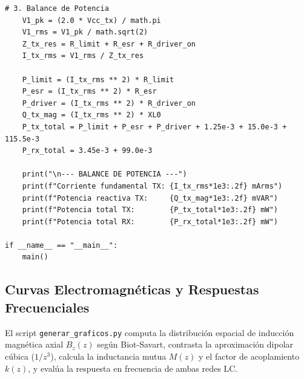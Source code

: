 \begin{lstlisting}[style=custompy, caption={Cálculo analítico de parámetros de ganancia, potencia e ISI (\texttt{informe\_ieee/datos/calcular\_parametros\_enlace.py})}]
    # 3. Balance de Potencia
    V1_pk = (2.0 * Vcc_tx) / math.pi
    V1_rms = V1_pk / math.sqrt(2)
    Z_tx_res = R_limit + R_esr + R_driver_on
    I_tx_rms = V1_rms / Z_tx_res
    
    P_limit = (I_tx_rms ** 2) * R_limit
    P_esr = (I_tx_rms ** 2) * R_esr
    P_driver = (I_tx_rms ** 2) * R_driver_on
    Q_tx_mag = (I_tx_rms ** 2) * XL0
    P_tx_total = P_limit + P_esr + P_driver + 1.25e-3 + 15.0e-3 + 115.5e-3
    P_rx_total = 3.45e-3 + 99.0e-3

    print("\n--- BALANCE DE POTENCIA ---")
    print(f"Corriente fundamental TX: {I_tx_rms*1e3:.2f} mArms")
    print(f"Potencia reactiva TX:     {Q_tx_mag*1e3:.2f} mVAR")
    print(f"Potencia total TX:        {P_tx_total*1e3:.2f} mW")
    print(f"Potencia total RX:        {P_rx_total*1e3:.2f} mW")

if __name__ == "__main__":
    main()
\end{lstlisting}

\subsection{Curvas Electromagnéticas y Respuestas Frecuenciales}

El script \texttt{generar\_graficos.py} computa la distribución espacial de inducción magnética axial $B_z(z)$ según Biot-Savart, contrasta la aproximación dipolar cúbica ($1/z^3$), calcula la inductancia mutua $M(z)$ y el factor de acoplamiento $k(z)$, y evalúa la respuesta en frecuencia de ambas redes LC.

